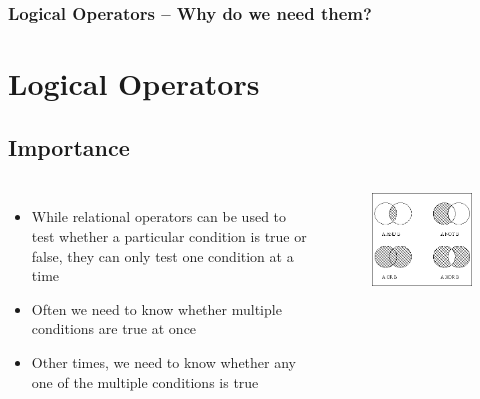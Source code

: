 \documentclass{beamer}
\begin{document}
\begin{frame}
    \frametitle{Logical Operators -- Why do we need them?}
    \section{Logical Operators} %
    \label{sec:logical_operators}
    \subsection{Importance} %
    \label{sub:importance_2}
    \begin{columns}
        \begin{itemize}
            \item While relational operators can be used to test whether a particular condition is true or false, they can only test one condition at a time
            \item Often we need to know whether multiple conditions are true at once
            \item Other times, we need to know whether any one of the multiple conditions is true
        \end{itemize}
            \begin{figure}
                \centering
                \includegraphics[scale=0.6]{venn.png}
            \end{figure}
    \end{columns}
\end{frame}
\end{document}
